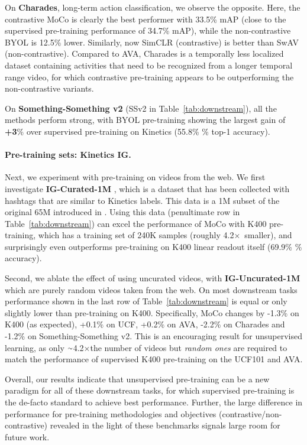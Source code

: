 \documentclass[final]{cvpr}
\newcommand{\tblref}[1]{Table~\ref{#1}}
\newcommand{\app}{\raise.17ex\hbox{$\scriptstyle\sim$}}
\def\x{$\times$}
\begin{document}
	On \textbf{Charades}, long-term action classification, we observe the opposite. Here, the contrastive MoCo is clearly the best performer with 33.5\% mAP (close to the supervised pre-training performance of 34.7\% mAP), while the non-contrastive BYOL is 12.5\% lower. Similarly, now \mbox{SimCLR} (contrastive) is better than SwAV (non-contrastive). Compared to AVA, Charades is a temporally less localized dataset containing activities that need to be recognized from a longer temporal range video, for which contrastive pre-training appears to be outperforming the non-contrastive variants. 
	
	On \textbf{Something-Something v2} (SSv2 in \tblref{tab:downstream}), all the methods perform strong, with BYOL pre-training showing the largest gain of \textbf{+3}\% over supervised pre-training on Kinetics (55.8\% \% top-1 accuracy).
	
	\paragraph{Pre-training sets: Kinetics \vs IG.}
	Next, we experiment with pre-training on videos from the web. We first investigate \textbf{IG-Curated-1M} \cite{Ghadiyaram2019}, which is a dataset that has been collected with hashtags that are similar to Kinetics labels. This data is a 1M subset of the original 65M introduced in \cite{Ghadiyaram2019}. Using this data (penultimate row in \tblref{tab:downstream}) can excel the performance of MoCo with K400 pre-training, which has a training set of 240K samples (roughly 4.2\x~smaller), and surprisingly even outperforms pre-training on K400 linear readout itself (69.9\% \% accuracy).
	
	Second, we ablate the effect of using uncurated videos, with \textbf{IG-Uncurated-1M} which are purely random videos taken from the web. On most downstream tasks performance shown in the last row of \tblref{tab:downstream} is equal or only slightly lower than pre-training on K400. Specifically, MoCo changes by \mbox{-1.3}\% on K400 (as expected), +0.1\% on UCF, +0.2\% on AVA, -2.2\% on Charades and -1.2\% on Something-Something v2.  This is an encouraging result for unsupervised learning, as only $\app$4.2\x the number of videos but \textit{random ones}  are required to match the performance of supervised K400 pre-training on the UCF101 and AVA. %
		
	Overall, our results indicate that unsupervised pre-training can be a new paradigm for all of these downstream tasks, for which supervised pre-training is the de-facto standard to achieve best performance. Further, the large difference in performance for pre-training methodologies and objectives (\eg contrastive/non-contrastive) revealed in the light of these benchmarks signals large room for future work.
			
\end{document}
